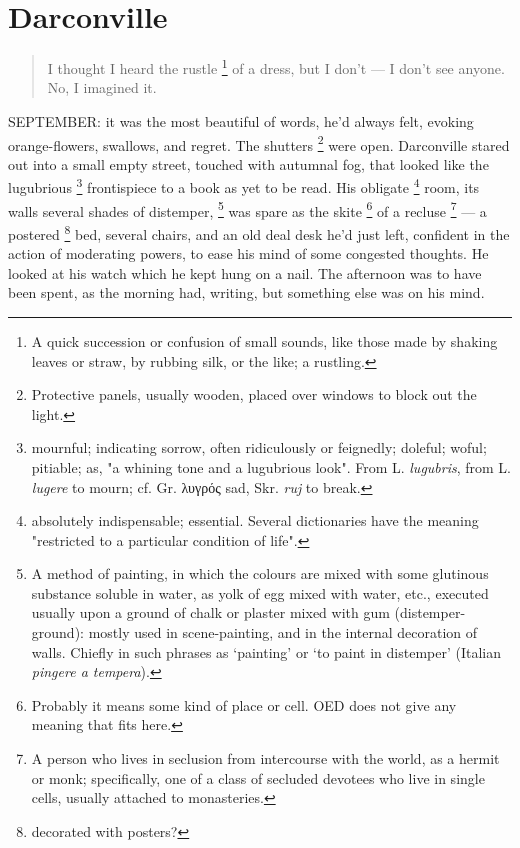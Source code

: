 \chapter{Darconville}

\begin{quotation}
I thought I heard the rustle 
\footnote{A quick succession or confusion of small sounds, like those made by
shaking leaves or straw, by rubbing silk, or the like; a rustling.}
of a dress, but I don’t --- I don’t see anyone. No, I imagined it. \\
\end{quotation} 
\vspace{0.2cm}

SEPTEMBER: it was the most beautiful of words, he’d always felt, evoking
orange-flowers, swallows, and regret. The shutters 
\footnote{Protective panels, usually wooden, placed over windows to block out
the light.}
were open. Darconville stared
out into a small empty street, touched with autumnal fog, that looked like the
lugubrious 
\footnote{mournful; indicating sorrow, often ridiculously or feignedly; doleful;
woful; pitiable; as, "a whining tone and a lugubrious look".
From L. \textit{lugubris}, from L. \textit{lugere} to mourn; cf. Gr. λυγρός sad, 
Skr. \textit{ruj} to break.
}
frontispiece to a book as yet to be read. His obligate 
\footnote{\textdbend absolutely indispensable; essential. Several dictionaries
have the meaning "restricted to a particular condition of life".}
room, its walls several shades of distemper, 
\footnote{A method of painting, in which the colours are mixed with some
glutinous substance soluble in water, as yolk of egg mixed with water, etc.,
executed usually upon a ground of chalk or plaster mixed with gum
(distemper-ground): mostly used in scene-painting, and in the internal
decoration of walls. Chiefly in such phrases as ‘painting’ or ‘to paint in
distemper’ (Italian \textit{pingere a tempera}). 
}
was spare as the skite 
\footnote{\textdbend Probably it means some kind of place or cell. OED does not 
give any meaning that fits here.}
of a recluse
\footnote{A person who lives in seclusion from intercourse with the world, as a
hermit or monk; specifically, one of a class of secluded devotees who live in
single cells, usually attached to monasteries.
}
--- a postered 
\footnote{\textdbend decorated with posters?}
bed, several chairs, and an old deal desk he’d just left, confident in
the action of moderating powers, to ease his mind of some congested thoughts. He
looked at his watch which he kept hung on a nail. The afternoon was to have been
spent, as the morning had, writing, but something else was on his mind.

